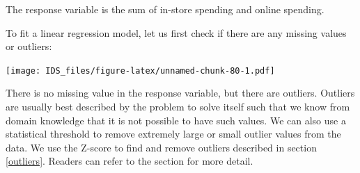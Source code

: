 \documentclass[12pt,]{krantz}
\makeatletter
\newenvironment{Shaded}{\begin{snugshade}}{\end{snugshade}}
\newcommand{\CommentTok}[1]{\textcolor[rgb]{0.37,0.37,0.37}{\textit{#1}}}
\newcommand{\DataTypeTok}[1]{\textcolor[rgb]{0.27,0.27,0.27}{#1}}
\newcommand{\DecValTok}[1]{\textcolor[rgb]{0.06,0.06,0.06}{#1}}
\newcommand{\FloatTok}[1]{\textcolor[rgb]{0.06,0.06,0.06}{#1}}
\newcommand{\KeywordTok}[1]{\textcolor[rgb]{0.27,0.27,0.27}{\textbf{#1}}}
\newcommand{\NormalTok}[1]{#1}
\newcommand{\OperatorTok}[1]{\textcolor[rgb]{0.43,0.43,0.43}{\textbf{#1}}}
\newcommand{\StringTok}[1]{\textcolor[rgb]{0.5,0.5,0.5}{#1}}
\newenvironment{kframe}{%
\medskip{}
\setlength{\fboxsep}{.8em}
 \def\at@end@of@kframe{}%
 \ifinner\ifhmode%
  \def\at@end@of@kframe{\end{minipage}}%
  \begin{minipage}{\columnwidth}%
 \fi\fi%
 \def\FrameCommand##1{\hskip\@totalleftmargin \hskip-\fboxsep
 \colorbox{shadecolor}{##1}\hskip-\fboxsep
     \hskip-\linewidth \hskip-\@totalleftmargin \hskip\columnwidth}%
 \MakeFramed {\advance\hsize-\width
   \@totalleftmargin\z@ \linewidth\hsize
   \@setminipage}}%
 {\par\unskip\endMakeFramed%
 \at@end@of@kframe}
\renewenvironment{Shaded}{\begin{kframe}}{\end{kframe}}
\makeatother
\begin{document}
The response variable is the sum of in-store spending and online spending.

\begin{Shaded}
\end{Shaded}

To fit a linear regression model, let us first check if there are any missing values or outliers:

\begin{Shaded}
\end{Shaded}

\texttt{[image: IDS\_files/figure-latex/unnamed-chunk-80-1.pdf]}

There is no missing value in the response variable, but there are outliers. Outliers are usually best described by the problem to solve itself such that we know from domain knowledge that it is not possible to have such values. We can also use a statistical threshold to remove extremely large or small outlier values from the data. We use the Z-score to find and remove outliers described in section \ref{outliers}. Readers can refer to the section for more detail.

\begin{Shaded}
\end{Shaded}
\end{document}
